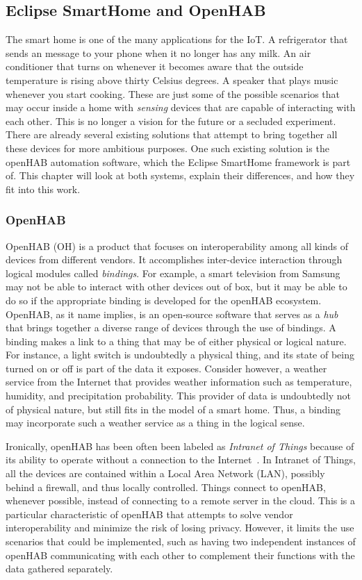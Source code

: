 \documentclass[12pt]{article}
\begin{document}
\subsection{Eclipse SmartHome and OpenHAB}

The smart home is one of the many applications for the IoT. A refrigerator that sends an message to your phone when it no longer has any milk. An air conditioner that turns on whenever it becomes aware that the outside temperature is rising above thirty Celsius degrees. A speaker that plays music whenever you start cooking. These are just some of the possible scenarios that may occur inside a home with \emph{sensing} devices that are capable of interacting with each other. This is no longer a vision for the future or a secluded experiment. There are already several existing solutions that attempt to bring together all these devices for more ambitious purposes. One such existing solution is the openHAB automation software, which the Eclipse SmartHome framework is part of. This chapter will look at both systems, explain their differences, and how they fit into this work. 

\subsubsection{OpenHAB}
\label{sssec:oh}
OpenHAB (OH) is a product that focuses on interoperability among all kinds of devices from different vendors. It accomplishes inter-device interaction through logical modules called \emph{bindings}. For example, a smart television from Samsung may not be able to interact with other devices out of box, but it may be able to do so if the appropriate binding is developed for the openHAB ecosystem. OpenHAB, as it name implies, is an open-source software that serves as a \emph{hub} that brings together a diverse range of devices through the use of bindings. A binding makes a link to a thing that may be of either physical or logical nature. For instance, a light switch is undoubtedly a physical thing, and its state of being turned on or off is part of the data it exposes. Consider however, a weather service from the Internet that provides weather information such as temperature, humidity, and precipitation probability. This provider of data is undoubtedly not of physical nature, but still fits in the model of a smart home. Thus, a binding may incorporate such a weather service as a thing in the logical sense.

Ironically, openHAB has been often been labeled as \emph{Intranet of Things} because of its ability to operate without a connection to the Internet~\cite{openhab_03}. In Intranet of Things, all the devices are contained within a Local Area Network (LAN), possibly behind a firewall, and thus locally controlled. Things connect to openHAB, whenever possible, instead of connecting to a remote server in the cloud. This is a particular characteristic of openHAB that attempts to solve vendor interoperability and minimize the risk of losing privacy. However, it limits the use scenarios that could be implemented, such as having two independent instances of openHAB communicating with each other to complement their functions with the data gathered separately.
\end{document}
